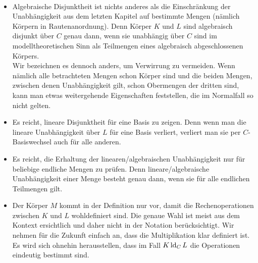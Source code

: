     \begin{remark}
    	\ 
    	\begin{itemize}
    		\item Algebraische Disjunktheit ist nichts anderes als die Einschränkung der Unabhängigkeit aus dem letzten Kapitel auf bestimmte Mengen (nämlich Körpern in Rautenanordnung). Denn Körper $K$ und $L$ sind algebraisch disjunkt über $C$ genau dann, wenn sie unabhängig über $C$ sind im modelltheoretischen Sinn als Teilmengen eines algebraisch abgeschlossenen Körpers.\\
    		Wir bezeichnen es dennoch anders, um Verwirrung zu vermeiden. Wenn nämlich alle betrachteten Mengen schon Körper sind und die beiden Mengen, zwischen denen Unabhängigkeit gilt, schon Obermengen der dritten sind, kann man etwas weitergehende Eigenschaften feststellen, die im Normalfall so nicht gelten.
    		\item Es reicht, lineare Disjunktheit für eine Basis zu zeigen. Denn wenn man die lineare Unabhängigkeit über $L$ für eine Basis verliert, verliert man sie per $C$-Basiswechsel auch für alle anderen.
    		\item Es reicht, die Erhaltung der linearen/algebraischen Unabhängigkeit nur für beliebige endliche Mengen zu prüfen. Denn lineare/algebraische Unabhängigkeit einer Menge besteht genau dann, wenn sie für alle endlichen Teilmengen gilt.
    		\item Der Körper $M$ kommt in der Definition nur vor, damit die Rechenoperationen zwischen $K$ und $L$ wohldefiniert sind. Die genaue Wahl ist meist aus dem Kontext ersichtlich und daher nicht in der Notation berücksichtigt. Wir nehmen für die Zukunft einfach an, dass die Multiplikation klar definiert ist. Es wird sich ohnehin herausstellen, dass im Fall $K\operatorname{ld}_CL$ die Operationen eindeutig bestimmt sind.
    	\end{itemize}
    \end{remark}
    

